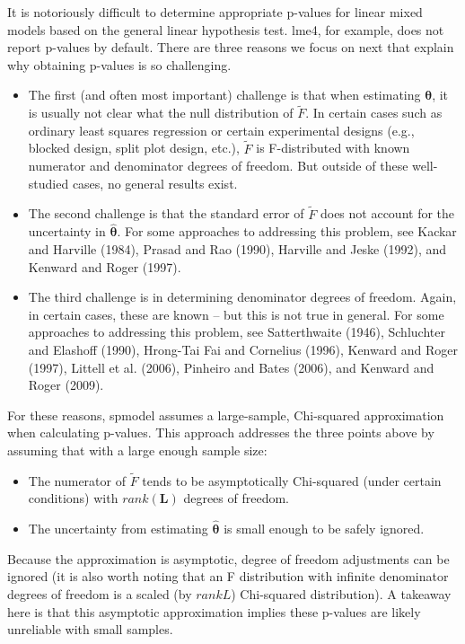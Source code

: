 \documentclass{article}
\providecommand{\tightlist}{%
  \setlength{\itemsep}{0pt}\setlength{\parskip}{0pt}}
\begin{document}
It is notoriously difficult to determine appropriate p-values for linear
mixed models based on the general linear hypothesis test. lme4, for
example, does not report p-values by default. There are three reasons we
focus on next that explain why obtaining p-values is so challenging.

\begin{itemize}
\tightlist
\item
  The first (and often most important) challenge is that when estimating
  \(\bm{\theta}\), it is usually not clear what the null distribution of
  \(\tilde{F}\). In certain cases such as ordinary least squares
  regression or certain experimental designs (e.g., blocked design,
  split plot design, etc.), \(\tilde{F}\) is F-distributed with known
  numerator and denominator degrees of freedom. But outside of these
  well-studied cases, no general results exist.
\item
  The second challenge is that the standard error of \(\tilde{F}\) does
  not account for the uncertainty in \(\bm{\hat{\theta}}\). For some
  approaches to addressing this problem, see Kackar and Harville (1984),
  Prasad and Rao (1990), Harville and Jeske (1992), and Kenward and
  Roger (1997).
\item
  The third challenge is in determining denominator degrees of freedom.
  Again, in certain cases, these are known -- but this is not true in
  general. For some approaches to addressing this problem, see
  Satterthwaite (1946), Schluchter and Elashoff (1990), Hrong-Tai Fai
  and Cornelius (1996), Kenward and Roger (1997), Littell et al. (2006),
  Pinheiro and Bates (2006), and Kenward and Roger (2009).
\end{itemize}

For these reasons, spmodel assumes a large-sample, Chi-squared
approximation when calculating p-values. This approach addresses the
three points above by assuming that with a large enough sample size:

\begin{itemize}
\tightlist
\item
  The numerator of \(\tilde{F}\) tends to be asymptotically Chi-squared
  (under certain conditions) with \(rank(\mathbf{L})\) degrees of
  freedom.
\item
  The uncertainty from estimating \(\bm{\hat{\theta}}\) is small enough
  to be safely ignored.
\end{itemize}

Because the approximation is asymptotic, degree of freedom adjustments
can be ignored (it is also worth noting that an F distribution with
infinite denominator degrees of freedom is a scaled (by \(rank{L}\))
Chi-squared distribution). A takeaway here is that this asymptotic
approximation implies these p-values are likely unreliable with small
samples.
\end{document}
